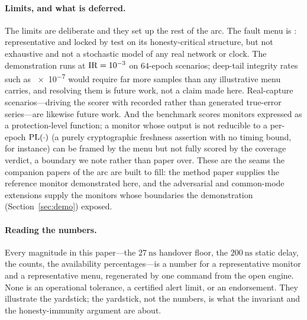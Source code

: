 \paragraph{Limits, and what is deferred.}
The limits are deliberate and they set up the rest of the arc. The fault menu is
\Modelled{}: representative and locked by test on its honesty-critical structure,
but not exhaustive and not a stochastic model of any real network or clock. The
demonstration runs at $\mathrm{IR}=\num{e-3}$ on $64$-epoch scenarios; deep-tail integrity
rates such as \num{e-7} would require far more samples than any illustrative menu
carries, and resolving them is future work, not a claim made here. Real-capture
scenarios---driving the scorer with recorded rather than generated true-error
series---are likewise future work. And the benchmark scores monitors expressed as a
protection-level function; a monitor whose output is not reducible to a per-epoch
$\mathrm{PL}(\cdot)$ (a purely cryptographic freshness assertion with no timing bound, for
instance) can be framed by the menu but not fully scored by the coverage verdict, a
boundary we note rather than paper over. These are the seams the companion papers
of the arc are built to fill: the method paper \citep{baweja2026cti} supplies the
reference monitor demonstrated here, and the adversarial and common-mode extensions
supply the monitors whose boundaries the demonstration
(Section~\ref{sec:demo}) exposed.

\paragraph{Reading the numbers.}
Every magnitude in this paper---the $\SI{27}{\nano\second}$ handover floor, the
$\SI{200}{\nano\second}$ static delay, the \HMI{} counts, the availability
percentages---is a \Modelled{} number for a representative monitor and a
representative menu, regenerated by one command from the open engine. None is an
operational tolerance, a certified alert limit, or an endorsement. They illustrate
the yardstick; the yardstick, not the numbers, is what the \Proven{} invariant and
the honesty-immunity argument are about.
